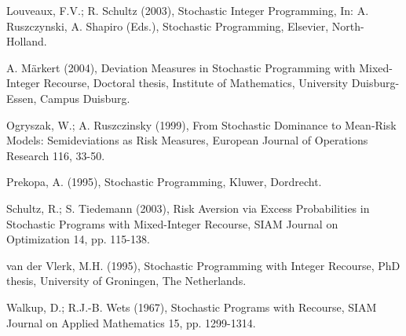 \documentclass[11pt,draft]{article}
\newcommand{\+}{{\ti{+}}}
\newcommand{\1}{{\ti{1}}}
\begin{document}
\begin{thebibliography}{99}
 Louveaux, F.V.; R. Schultz (2003), Stochastic Integer Programming, In:
A. Ruszczynski, A. Shapiro (Eds.), Stochastic Programming, Elsevier, North-Holland.

 A. M\"arkert (2004), Deviation Measures in Stochastic Programming with Mixed-Integer
  Recourse, Doctoral thesis, Institute of Mathematics, University Duisburg-Essen, Campus Duisburg.

 Ogryszak, W.; A. Ruszczinsky (1999), From Sto\-chastic
Dominance to Mean-Risk Models: 
Semideviations as Risk Measures, European Journal of Operations Research 116, 33-50.

 Prekopa, A. (1995), Stochastic Programming, Kluwer, Dordrecht.

 Schultz, R.; S. Tiedemann (2003), Risk Aversion via Excess
Probabilities in Stochastic Programs with Mixed-Integer Recourse, SIAM Journal on Optimization 14, pp. 115-138.

 van der Vlerk, M.H. (1995), Stochastic Programming with Integer Recourse, PhD
thesis, University of Groningen, The Netherlands. 

 Walkup, D.; R.J.-B. Wets (1967), Stochastic Programs with Recourse, SIAM
Journal on Applied Mathematics 15, pp. 1299-1314.

\end{thebibliography}
\end{document}
